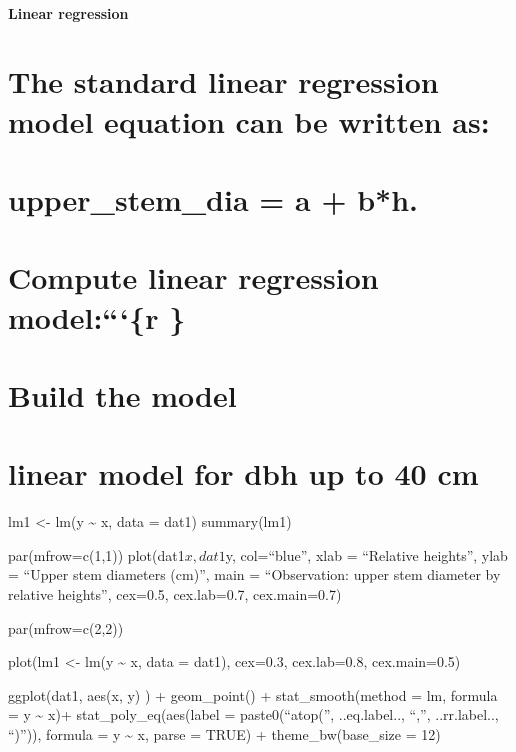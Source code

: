 \documentclass[
]{article}
\begin{document}
\hypertarget{linear-regression}{%
\paragraph{Linear regression}\label{linear-regression}}

\hypertarget{the-standard-linear-regression-model-equation-can-be-written-as}{%
\section{The standard linear regression model equation can be written
as:}\label{the-standard-linear-regression-model-equation-can-be-written-as}}

\hypertarget{upper_stem_dia-a-bh.}{%
\section{upper\_stem\_dia = a + b*h.}\label{upper_stem_dia-a-bh.}}

\hypertarget{compute-linear-regression-modelr}{%
\section{Compute linear regression model:```\{r
\}}\label{compute-linear-regression-modelr}}

\hypertarget{build-the-model}{%
\section{Build the model}\label{build-the-model}}

\hypertarget{linear-model-for-dbh-up-to-40-cm}{%
\section{linear model for dbh up to 40
cm}\label{linear-model-for-dbh-up-to-40-cm}}

lm1 \textless- lm(y \textasciitilde{} x, data = dat1) summary(lm1)

par(mfrow=c(1,1)) plot(dat1\(x, dat1\)y, col=``blue'', xlab = ``Relative
heights'', ylab = ``Upper stem diameters (cm)'', main = ``Observation:
upper stem diameter by relative heights'', cex=0.5, cex.lab=0.7,
cex.main=0.7)

par(mfrow=c(2,2))

plot(lm1 \textless- lm(y \textasciitilde{} x, data = dat1), cex=0.3,
cex.lab=0.8, cex.main=0.5)

ggplot(dat1, aes(x, y) ) + geom\_point() + stat\_smooth(method = lm,
formula = y \textasciitilde{} x)+ stat\_poly\_eq(aes(label =
paste0(``atop('', ..eq.label.., ``,'', ..rr.label.., ``)'')), formula =
y \textasciitilde{} x, parse = TRUE) + theme\_bw(base\_size = 12)
\end{document}
